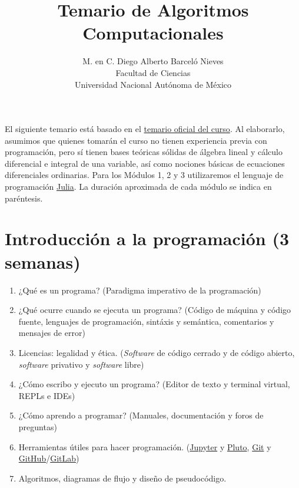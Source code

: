 \documentclass[a4paper]{article}
\begin{document}
\title{Temario de Algoritmos Computacionales}
\author{M. en C. Diego Alberto Barceló Nieves \\ Facultad de Ciencias \\ Universidad Nacional Autónoma de México}
\date{}
\maketitle

El siguiente temario está basado en el \href{https://www.fciencias.unam.mx/estudiar-en-ciencias/estudios/licenciaturas/asignaturas/2016/1430}{temario oficial del curso}. Al elaborarlo, asumimos que quienes tomarán el curso no tienen experiencia previa con programación, pero sí tienen bases teóricas sólidas de álgebra lineal y cálculo diferencial e integral de una variable, así como nociones básicas de ecuaciones diferenciales ordinarias. Para los Módulos 1, 2 y 3 utilizaremos el lenguaje de programación \href{https://julialang.org/}{Julia}. La duración aproximada de cada módulo se indica en paréntesis.

\setcounter{section}{-1}

\section{Introducción a la programación (3 semanas)} \label{Sec: Introducción a la programación (3 semanas)} 

\begin{enumerate}[label=\arabic*.]

    \item ¿Qué es un programa? (Paradigma imperativo de la programación)

    \item ¿Qué ocurre cuando se ejecuta un programa? (Código de máquina y código fuente, lenguajes de programación, sintáxis y semántica, comentarios y mensajes de error)
    \item Licencias: legalidad y ética. (\emph{Software} de código cerrado y de código abierto, \emph{software} privativo y \emph{software} libre)
    \item ¿Cómo escribo y ejecuto un programa? (Editor de texto y terminal virtual, REPLs e IDEs)
    \item ¿Cómo aprendo a programar? (Manuales, documentación y foros de preguntas)
    \item Herramientas útiles para hacer programación. (\href{https://jupyter.org/}{Jupyter} y \href{https://github.com/fonsp/Pluto.jl/blob/main/README.md}{Pluto}, \href{https://git-scm.com/}{Git} y \href{https://github.com/}{GitHub}/\href{https://about.gitlab.com/}{GitLab})
    \item Algoritmos, diagramas de flujo y diseño de pseudocódigo.
\end{enumerate}
\end{document}
